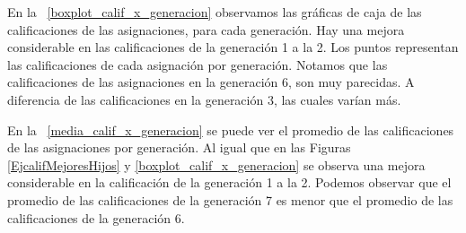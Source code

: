 %


En la \figurename{~\ref{boxplot_calif_x_generacion}} observamos las gráficas de caja de las calificaciones de las asignaciones, para cada generación. Hay una mejora considerable en las calificaciones de la generación 1 a la 2. Los puntos representan las calificaciones de cada asignación por generación. Notamos que las calificaciones de las asignaciones en la generación 6, son muy parecidas. A diferencia de las calificaciones en la generación 3, las cuales varían más.


En la \figurename{~\ref{media_calif_x_generacion}} se puede ver el promedio de las calificaciones de las asignaciones por generación. Al igual que en las Figuras \ref{EjcalifMejoresHijos} y \ref{boxplot_calif_x_generacion} se observa una mejora considerable en la calificación de la generación 1 a la 2. Podemos observar que el promedio de las calificaciones de la generación 7 es menor que el promedio de las calificaciones de la generación 6.


